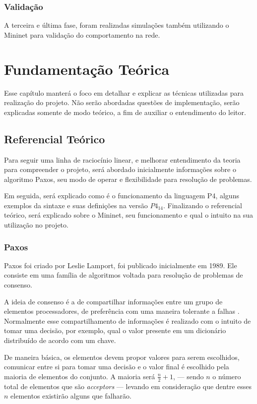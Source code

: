 \documentclass[
    12pt,
    openright, 
    oneside,
    a4paper,
    french,
    english,
    brazil
    ]{facom-ufu-abntex2}
\theoremstyle{definition}
\begin{document}
\subsection{Validação}
A terceira e última fase, foram realizadas simulações também utilizando o Mininet para validação 
do comportamento na rede. \cite{dang2015netpaxos}


\chapter{Fundamentação Teórica}
Esse capítulo manterá o foco em detalhar e explicar as técnicas utilizadas para realização 
do projeto. Não serão abordadas questões de implementação, serão explicadas somente de modo
teórico, a fim de auxiliar o entendimento do leitor.

\section{Referencial Teórico}
Para seguir uma linha de raciocínio linear, e melhorar entendimento da teoria
para compreender o projeto, será abordado inicialmente informações sobre o 
algoritmo Paxos, seu modo de operar e flexibilidade para resolução de problemas.

Em seguida, será explicado como é o funcionamento da linguagem P4, alguns exemplos da sintaxe e suas definições 
na versão $P4_{14}$. Finalizando o referencial teórico, será  explicado sobre o Mininet, seu funcionamento e qual 
o intuito na sua utilização no projeto.

\subsection{Paxos}
Paxos foi criado por Leslie Lamport, foi publicado inicialmente em 1989. Ele consiste em uma 
família de algoritmos voltada para resolução de problemas de consenso. 

A ideia de consenso é a de compartilhar informações entre um grupo de elementos
processadores, de preferência com uma maneira tolerante a falhas \cite{barborak1993consensus}.
Normalmente esse compartilhamento de informações é realizado com o intuito de tomar
uma decisão, por exemplo, qual o valor presente em um dicionário distribuído de acordo com um chave. 

De maneira básica, os elementos devem propor valores para serem escolhidos, 
comunicar entre si para tomar uma decisão e o valor final é escolhido pela maioria de 
elementos do conjunto. A maioria será $\frac{n}{2}+1$, --- sendo $n$ o número
total de elementos que são \emph{acceptors} --- levando em consideração que dentre esses $n$ 
elementos existirão alguns que falharão.
\end{document}

